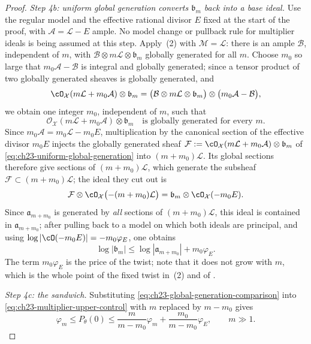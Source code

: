 \begin{proof}
\emph{Step 4b: uniform global generation converts $\mathfrak b_m$ back
into a base ideal.}
Use the regular model and the effective rational divisor $E$ fixed
at the start of the proof, with $\mathcal A=\mathcal L-E$ ample.  No
model change or pullback rule for multiplier ideals is being assumed at
this step.  Apply
\,(2) with
$\mathcal M=\mathcal L$: there is an ample $\mathcal B$, independent of
$m$, with $\mathcal B\otimes m\mathcal L\otimes\mathfrak b_m$ globally
generated for all $m$.  Choose $m_0$ so large that
$m_0\mathcal A-\mathcal B$ is integral and globally generated; since a
tensor product of two globally generated sheaves is globally generated, and
\[
 \cO_{\mathcal X}(m\mathcal L+m_0\mathcal A)\otimes\mathfrak b_m
 =\bigl(\mathcal B\otimes m\mathcal L\otimes\mathfrak b_m\bigr)
  \otimes\bigl(m_0\mathcal A-\mathcal B\bigr),
\]
we obtain one integer $m_0$, independent of $m$, such that
\begin{equation}\label{eq:ch23-uniform-global-generation}
 \mathcal O_{\mathcal X}(m\mathcal L+m_0\mathcal A)
       \otimes\mathfrak b_m
 \quad\text{is globally generated for every }m.
\end{equation}
Since $m_0\mathcal A=m_0\mathcal L-m_0E$, multiplication by the canonical
section of the effective divisor $m_0E$ injects the globally generated
sheaf $\mathcal F:=\cO_{\mathcal X}(m\mathcal L+m_0\mathcal A)\otimes
\mathfrak b_m$ of \eqref{eq:ch23-uniform-global-generation} into
$(m+m_0)\mathcal L$.  Its global sections therefore give sections of
$(m+m_0)\mathcal L$, which generate the subsheaf
$\mathcal F\subset(m+m_0)\mathcal L$; the ideal they cut out is
\[
 \mathcal F\otimes\cO_{\mathcal X}\bigl(-(m+m_0)\mathcal L\bigr)
 =\mathfrak b_m\otimes\cO_{\mathcal X}(-m_0E) .
\]
Since $\mathfrak a_{m+m_0}$ is generated by \emph{all} sections of
$(m+m_0)\mathcal L$, this ideal is contained in
$\mathfrak a_{m+m_0}$; after pulling back to a model on which both ideals
are principal, and using
$\log|\cO(-m_0E)|=-m_0\varphi_E$, one obtains
\begin{equation}\label{eq:ch23-global-generation-comparison}
 \log|\mathfrak b_m|
       \leq\log|\mathfrak a_{m+m_0}|+m_0\varphi_E .
\end{equation}
The term $m_0\varphi_E$ is the price of the twist; note that it does not
grow with $m$, which is the whole point of the fixed twist in
\,(2) and of
.

\emph{Step 4c: the sandwich.}
Substituting \eqref{eq:ch23-global-generation-comparison} into
\eqref{eq:ch23-multiplier-upper-control} with $m$ replaced by $m-m_0$
gives
\begin{equation}\label{eq:ch23-uniform-sandwich}
 \varphi_m
 \leq P_\theta(0)
 \leq
 \frac{m}{m-m_0}\varphi_m
 +\frac{m_0}{m-m_0}\varphi_E,
 \qquad m\gg1 .
\end{equation}


\end{proof}
